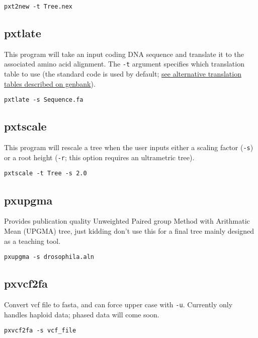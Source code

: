 \documentclass[12pt,letterpaper]{memoir}
\begin{document}
\begin{flushleft}
\begin{verbatim}
pxt2new -t Tree.nex
\end{verbatim}
\end{flushleft}

\subsection{pxtlate}

This program will take an input coding DNA sequence and translate it to the associated amino acid alignment. The \texttt{-t} argument specifies which translation table to use (the standard code is used by default; \href{https://www.ncbi.nlm.nih.gov/Taxonomy/Utils/wprintgc.cgi}{see alternative translation tables described on genbank}).


\begin{flushleft}
\begin{verbatim}
pxtlate -s Sequence.fa
\end{verbatim}
\end{flushleft}

\subsection{pxtscale}

This program will rescale a tree when the user inputs either a scaling factor (\texttt{-s}) or a root height (\texttt{-r}; this option requires an ultrametric tree).

\begin{flushleft}
\begin{verbatim}
pxtscale -t Tree -s 2.0
\end{verbatim}
\end{flushleft}

\subsection{pxupgma}

Provides publication quality Unweighted Paired group Method with Arithmatic Mean (UPGMA) tree, just kidding don't use this for a final tree mainly designed as a teaching tool.

\begin{flushleft}
\begin{verbatim}
pxupgma -s drosophila.aln
\end{verbatim}
\end{flushleft}

\subsection{pxvcf2fa}
Convert vcf file to fasta, and can force upper case with \texttt{-u}.
Currently only handles haploid data; phased data will come soon.

\begin{flushleft}
\begin{verbatim}
pxvcf2fa -s vcf_file
\end{verbatim}
\end{flushleft}
\end{document}
